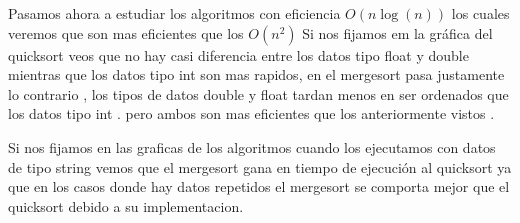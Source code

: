 \documentclass[11pt,openany]{book}
\begin{document}
    Pasamos ahora a estudiar los algoritmos con eficiencia \(O(n\log(n))\) los cuales veremos que son mas eficientes que los \(O(n^2)\)
    Si nos fijamos em la gráfica del quicksort veos que no hay casi diferencia entre los datos tipo float y double mientras que los datos tipo int son mas rapidos, 
    en el mergesort pasa justamente lo contrario , los tipos de datos double y float tardan menos en ser ordenados que los datos tipo int . 
    pero ambos son mas eficientes que los anteriormente vistos . 
    
    Si nos fijamos en las graficas de los algoritmos cuando los ejecutamos con datos de tipo string vemos que el mergesort gana en tiempo de ejecución al
    quicksort ya que en los casos donde hay datos repetidos el mergesort se comporta mejor que el quicksort debido a su implementacion.
\end{document}
